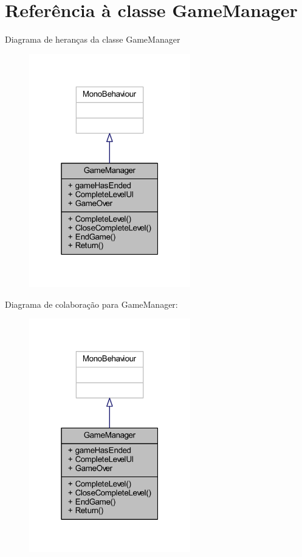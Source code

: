 \section{Referência à classe Game\+Manager}
\label{class_game_manager}


Diagrama de heranças da classe Game\+Manager
\nopagebreak
\begin{figure}[H]
\begin{center}
\leavevmode
\includegraphics[width=199pt]{class_game_manager__inherit__graph}
\end{center}
\end{figure}


Diagrama de colaboração para Game\+Manager\+:
\nopagebreak
\begin{figure}[H]
\begin{center}
\leavevmode
\includegraphics[width=199pt]{class_game_manager__coll__graph}
\end{center}
\end{figure}
